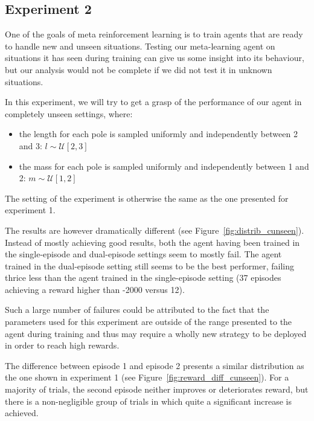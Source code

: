 \documentclass[letterpaper]{article}
\begin{document}
\subsection{Experiment 2}
One of the goals of meta reinforcement learning is to train agents that are
ready to handle new and unseen situations. Testing our meta-learning agent
on situations it has seen during training can give us some insight into
its behaviour, but our analysis would not be complete if we did not test it 
in unknown situations.

In this experiment, we will try to get a grasp of the performance of our agent
in completely unseen settings, where:
\begin{itemize}
	\item the length for each pole is sampled uniformly and independently 
		between 2 and 3:
		$l \sim \mathcal{U}[2, 3] $
	\item the mass for each pole is sampled uniformly and independently 
		between 1 and 2:
		$m \sim \mathcal{U}[1, 2] $
\end{itemize}

The setting of the experiment is otherwise the same as the one presented for
experiment 1.

The results are however dramatically different (see
Figure~\ref{fig:distrib_cunseen}). Instead of mostly
achieving good results, both the agent having been trained in the single-episode
and dual-episode settings seem to mostly fail. The agent trained
in the dual-episode setting still seems to be the best performer, failing thrice
less than the agent trained in the single-episode setting (37 episodes
achieving a reward higher than -2000 versus 12).

Such a large number of failures could be attributed to the fact that the
parameters used for this experiment are outside of the range presented to
the agent during training and thus may require a wholly new strategy to be
deployed in order to reach high rewards.

The difference between episode 1 and episode 2 presents a similar distribution
as the one shown in experiment 1 (see Figure~\ref{fig:reward_diff_cunseen}). 
For a majority of trials, the second episode
neither improves or deteriorates reward, but there is a non-negligible group
of trials in which quite a significant increase is achieved.
\end{document}
